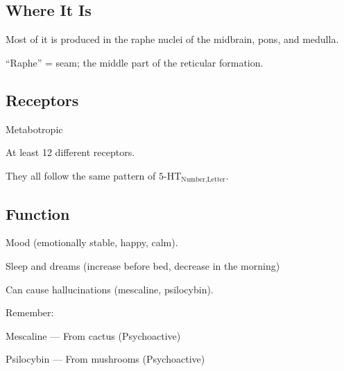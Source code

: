 \subsection{Where It Is}

\begin{coloredlist}
    \item Most of it is produced in the raphe nuclei of the midbrain, pons, and medulla.
    \begin{coloredlist}
        \item ``Raphe'' = seam; the middle part of the reticular formation.
    \end{coloredlist}
\end{coloredlist}

\subsection{Receptors}

\begin{coloredlist}
    \item Metabotropic
    \item At least 12 different receptors. 
    \begin{coloredlist}
        \item They all follow the same pattern of \(5\text{-HT}_{\text{Number},\text{Letter}}\).
    \end{coloredlist}
\end{coloredlist}

\subsection{Function}

\begin{coloredlist}
    \item Mood (emotionally stable, happy, calm).
    \item Sleep and dreams (increase before bed, decrease in the morning)
    \item Can cause hallucinations (mescaline, psilocybin).
    \begin{coloredlist}
        \item Remember:
        \begin{coloredlist}
            \item Mescaline — From cactus (Psychoactive)
            \item Psilocybin — From mushrooms (Psychoactive)
        \end{coloredlist}
    \end{coloredlist}
\end{coloredlist}

